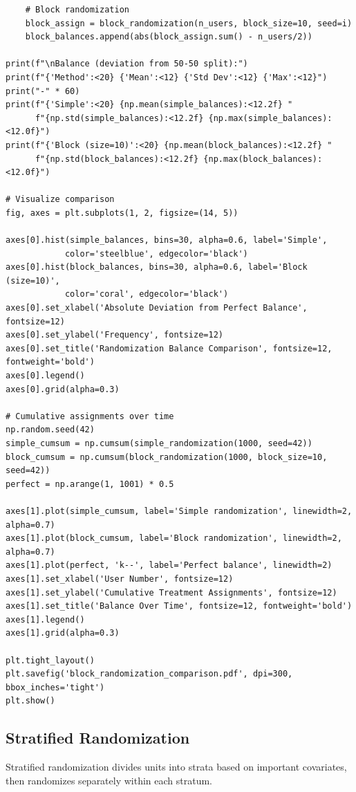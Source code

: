 \begin{lstlisting}
    # Block randomization
    block_assign = block_randomization(n_users, block_size=10, seed=i)
    block_balances.append(abs(block_assign.sum() - n_users/2))

print(f"\nBalance (deviation from 50-50 split):")
print(f"{'Method':<20} {'Mean':<12} {'Std Dev':<12} {'Max':<12}")
print("-" * 60)
print(f"{'Simple':<20} {np.mean(simple_balances):<12.2f} "
      f"{np.std(simple_balances):<12.2f} {np.max(simple_balances):<12.0f}")
print(f"{'Block (size=10)':<20} {np.mean(block_balances):<12.2f} "
      f"{np.std(block_balances):<12.2f} {np.max(block_balances):<12.0f}")

# Visualize comparison
fig, axes = plt.subplots(1, 2, figsize=(14, 5))

axes[0].hist(simple_balances, bins=30, alpha=0.6, label='Simple',
            color='steelblue', edgecolor='black')
axes[0].hist(block_balances, bins=30, alpha=0.6, label='Block (size=10)',
            color='coral', edgecolor='black')
axes[0].set_xlabel('Absolute Deviation from Perfect Balance', fontsize=12)
axes[0].set_ylabel('Frequency', fontsize=12)
axes[0].set_title('Randomization Balance Comparison', fontsize=12, fontweight='bold')
axes[0].legend()
axes[0].grid(alpha=0.3)

# Cumulative assignments over time
np.random.seed(42)
simple_cumsum = np.cumsum(simple_randomization(1000, seed=42))
block_cumsum = np.cumsum(block_randomization(1000, block_size=10, seed=42))
perfect = np.arange(1, 1001) * 0.5

axes[1].plot(simple_cumsum, label='Simple randomization', linewidth=2, alpha=0.7)
axes[1].plot(block_cumsum, label='Block randomization', linewidth=2, alpha=0.7)
axes[1].plot(perfect, 'k--', label='Perfect balance', linewidth=2)
axes[1].set_xlabel('User Number', fontsize=12)
axes[1].set_ylabel('Cumulative Treatment Assignments', fontsize=12)
axes[1].set_title('Balance Over Time', fontsize=12, fontweight='bold')
axes[1].legend()
axes[1].grid(alpha=0.3)

plt.tight_layout()
plt.savefig('block_randomization_comparison.pdf', dpi=300, bbox_inches='tight')
plt.show()
\end{lstlisting}

\subsection{Stratified Randomization}

Stratified randomization divides units into strata based on important covariates, then randomizes separately within each stratum.

